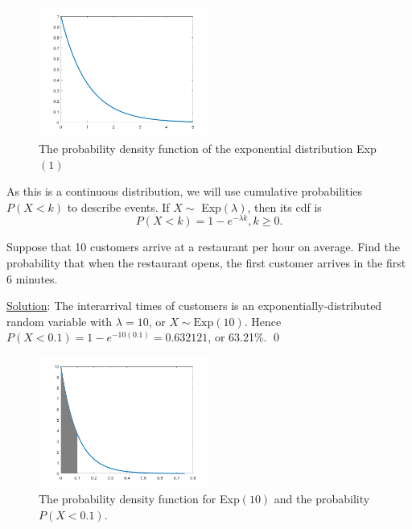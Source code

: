 \vspace{-0.5cm}

\begin{figure}[htbp]
	\centering
	\includegraphics[width=0.5\textwidth]{fig/2_expo.png}
	\caption{The probability density function of the exponential distribution Exp$(1)$ \label{fig:2_expo}}
\end{figure}

As this is a continuous distribution, we will use cumulative probabilities $P(X < k)$ to describe events.
If $X \sim $ Exp$(\lambda)$, then its cdf is \[ P(X < k) = 1 - e^{-\lambda k}, k \geq 0.\]

\begin{myexample}\label{2:expo_example}
Suppose that 10 customers arrive at a restaurant per hour on average.
Find the probability that when the restaurant opens, the first customer arrives in the first 6 minutes.

\underline{Solution}: The interarrival times of customers is an exponentially-distributed random variable with $\lambda = 10$, or $X \sim \text{Exp}(10)$. Hence $P(X < 0.1) = 1 - e^{-10(0.1)} = 0.632121$, or 63.21\%. \qed
\end{myexample}

\begin{figure}[htbp]
	\centering
	\includegraphics[width=0.5\textwidth]{fig/2_expo_example.png}
	\caption{The probability density function for Exp$(10)$ and the probability $P(X < 0.1)$. \label{fig:2_expo_example}}
\end{figure}


